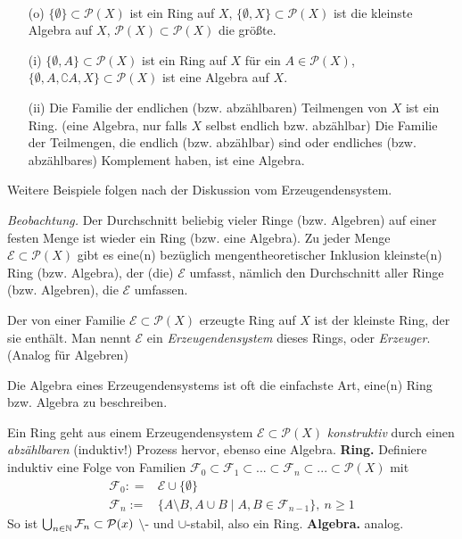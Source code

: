 \begin{example} \
\begin{enumerate}
\item[(o)] $\{ \emptyset\} \subset \mathcal{P}(X)$ ist ein Ring auf $X$, \newline
$\{\emptyset, X\} \subset \mathcal{P}(X)$ ist die kleinste Algebra auf $X$, $\mathcal{P}(X) \subset \mathcal{P}(X)$ die größte.
\item [(i)] $\{ \emptyset, A \} \subset \mathcal{P}(X)$ ist ein Ring auf $X$ für ein $A \in \mathcal{P}(X)$, \newline
$\{\emptyset, A, \complement A, X\} \subset \mathcal{P}(X) $ ist eine Algebra auf $X$.
\item[(ii)] Die Familie der endlichen (bzw. abzählbaren) Teilmengen von $X$ ist ein Ring. (eine Algebra, nur falls $X$ selbst endlich bzw. abzählbar) \newline
Die Familie der Teilmengen, die endlich (bzw. abzählbar) sind oder endliches (bzw. abzählbares) Komplement haben, ist eine Algebra.
\end{enumerate}
Weitere Beispiele folgen nach der Diskussion vom Erzeugendensystem.
\end{example}
\textit{Beobachtung.} Der Durchschnitt beliebig vieler Ringe (bzw. Algebren) auf einer festen Menge ist wieder ein Ring (bzw. eine Algebra). Zu jeder Menge $\mathcal{E} \subset \mathcal{P}(X)$ gibt es eine(n) bezüglich mengentheoretischer Inklusion kleinste(n) Ring (bzw. Algebra), der (die) $\mathcal{E}$ umfasst, nämlich den Durchschnitt aller Ringe (bzw. Algebren), die $\mathcal{E}$ umfassen.
\begin{definition}
\begin{mdframed}
Der von einer Familie $\mathcal{E} \subset \mathcal{P}(X)$ erzeugte Ring auf $X$ ist der kleinste Ring, der sie enthält. Man nennt $\mathcal{E}$ ein \emph{Erzeugendensystem} dieses Rings, oder \emph{Erzeuger}. (Analog für Algebren)
\end{mdframed}
Die Algebra eines Erzeugendensystems ist oft die einfachste Art, eine(n) Ring bzw. Algebra zu beschreiben. 
\end{definition}
Ein Ring geht aus einem Erzeugendensystem $\mathcal{E} \subset \mathcal{P}(X)$ \emph{konstruktiv} durch einen \emph{abzählbaren} (induktiv!) Prozess hervor, ebenso eine Algebra. \vspace{0.5pc}
\newline
\textbf{Ring.} Definiere induktiv eine Folge von Familien $\mathcal{F}_0 \subset \mathcal{F}_1 \subset ... \subset \mathcal{F}_n \subset ... \subset \mathcal{P}(X)$ mit
\begin{align*}
\mathcal{F}_0 : = &\mathcal{E}\cup \{\emptyset\}  \\
\mathcal{F}_n :=  &\{ A\setminus B, A \cup B \mid A,B \in \mathcal{F}_{n-1} \},\  n \geq 1
\end{align*}
So ist $\bigcup_{n\in \mathbb{N}} \mathcal{F}_n \subset \mathcal{P}(x)$ $\setminus$- und $\cup$-stabil, also ein Ring.  \vspace{0.5pc} \newline 
\textbf{Algebra.} analog.
